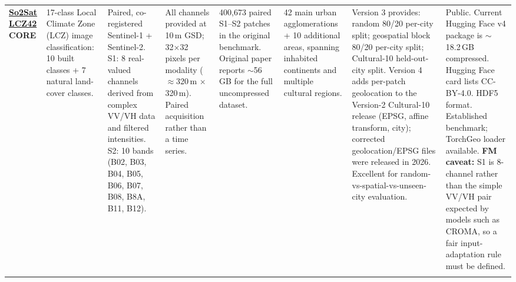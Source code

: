 \begin{landscape}
\begin{longtable}{
    Q{1.8cm}
    Q{2.5cm}
    Q{3.0cm}
    Q{2.5cm}
    Q{2.1cm}
    Q{3.0cm}
    Q{3.4cm}
    Q{3.4cm}
}
\href{https://github.com/zhu-xlab/So2Sat-LCZ42}{\textbf{So2Sat LCZ42}}\newline
\textbf{CORE}
&
17-class Local Climate Zone (LCZ) image classification: 10 built classes + 7 natural land-cover classes.
&
Paired, co-registered Sentinel-1 + Sentinel-2. S1: 8 real-valued channels derived from complex VV/VH data and filtered intensities. S2: 10 bands (B02, B03, B04, B05, B06, B07, B08, B8A, B11, B12).
&
All channels provided at 10\,m GSD; 32$\times$32 pixels per modality ($\approx$320\,m $\times$ 320\,m). Paired acquisition rather than a time series.
&
400,673 paired S1--S2 patches in the original benchmark. Original paper reports $\sim$56\,GB for the full uncompressed dataset.
&
42 main urban agglomerations + 10 additional areas, spanning inhabited continents and multiple cultural regions.
&
Version 3 provides: random 80/20 per-city split; geospatial block 80/20 per-city split; Cultural-10 held-out-city split. Version 4 adds per-patch geolocation to the Version-2 Cultural-10 release (EPSG, affine transform, city); corrected geolocation/EPSG files were released in 2026. Excellent for random-vs-spatial-vs-unseen-city evaluation.
&
Public. Current Hugging Face v4 package is $\sim$18.2\,GB compressed. Hugging Face card lists CC-BY-4.0. HDF5 format. Established benchmark; TorchGeo loader available. \textbf{FM caveat:} S1 is 8-channel rather than the simple VV/VH pair expected by models such as CROMA, so a fair input-adaptation rule must be defined.
\\
\addlinespace


\end{longtable}
\end{landscape}
